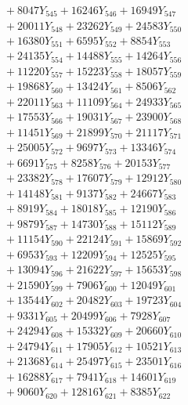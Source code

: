 \documentclass[a4paper,10pt]{article}
\begin{document}
{\begin{align}
&\;  + 8047 Y_{545} + 16246 Y_{546} + 16949 Y_{547} \\[0.3ex]
&\;  + 20011 Y_{548} + 23262 Y_{549} + 24583 Y_{550} \\[0.3ex]
&\;  + 16380 Y_{551} + 6595 Y_{552} + 8854 Y_{553} \\[0.3ex]
&\;  + 24135 Y_{554} + 14488 Y_{555} + 14264 Y_{556} \\[0.3ex]
&\;  + 11220 Y_{557} + 15223 Y_{558} + 18057 Y_{559} \\[0.3ex]
&\;  + 19868 Y_{560} + 13424 Y_{561} + 8506 Y_{562} \\[0.3ex]
&\;  + 22011 Y_{563} + 11109 Y_{564} + 24933 Y_{565} \\[0.3ex]
&\;  + 17553 Y_{566} + 19031 Y_{567} + 23900 Y_{568} \\[0.5ex]\allowbreak
&\;  + 11451 Y_{569} + 21899 Y_{570} + 21117 Y_{571} \\[0.3ex]
&\;  + 25005 Y_{572} + 9697 Y_{573} + 13346 Y_{574} \\[0.3ex]
&\;  + 6691 Y_{575} + 8258 Y_{576} + 20153 Y_{577} \\[0.3ex]
&\;  + 23382 Y_{578} + 17607 Y_{579} + 12912 Y_{580} \\[0.3ex]
&\;  + 14148 Y_{581} + 9137 Y_{582} + 24667 Y_{583} \\[0.3ex]
&\;  + 8919 Y_{584} + 18018 Y_{585} + 12190 Y_{586} \\[0.3ex]
&\;  + 9879 Y_{587} + 14730 Y_{588} + 15112 Y_{589} \\[0.3ex]
&\;  + 11154 Y_{590} + 22124 Y_{591} + 15869 Y_{592} \\[0.3ex]
&\;  + 6953 Y_{593} + 12209 Y_{594} + 12525 Y_{595} \\[0.3ex]
&\;  + 13094 Y_{596} + 21622 Y_{597} + 15653 Y_{598} \\[0.5ex]\allowbreak
&\;  + 21590 Y_{599} + 7906 Y_{600} + 12049 Y_{601} \\[0.3ex]
&\;  + 13544 Y_{602} + 20482 Y_{603} + 19723 Y_{604} \\[0.3ex]
&\;  + 9331 Y_{605} + 20499 Y_{606} + 7928 Y_{607} \\[0.3ex]
&\;  + 24294 Y_{608} + 15332 Y_{609} + 20660 Y_{610} \\[0.3ex]
&\;  + 24794 Y_{611} + 17905 Y_{612} + 10521 Y_{613} \\[0.3ex]
&\;  + 21368 Y_{614} + 25497 Y_{615} + 23501 Y_{616} \\[0.3ex]
&\;  + 16288 Y_{617} + 7941 Y_{618} + 14601 Y_{619} \\[0.3ex]
&\;  + 9060 Y_{620} + 12816 Y_{621} + 8385 Y_{622} \\[0.3ex]

\end{align}}
\end{document}
